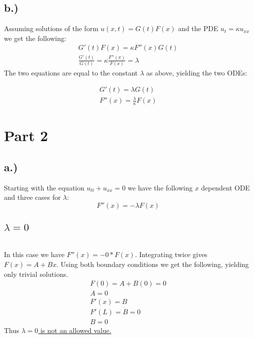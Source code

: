 \documentclass{article}
\begin{document}
\subsection*{b.)}
Assuming solutions of the form $u(x,t) = G(t)F(x)$ and the PDE $u_t = \kappa u_{xx}$ we get the following:
\begin{equation}
\begin{aligned}
G'(t)F(x) = \kappa F''(x)G(t)\\
\frac{G'(t)}{G(t)} = \kappa \frac{F''(x)}{F(x)} = \lambda
\end{aligned}
\end{equation}
The two equations are equal to the constant $\lambda $ as above, yielding the two ODEs:
\begin{tcolorbox}[minipage,colback=white,arc=0pt,outer arc=0pt]
\begin{equation}
\begin{aligned}
G'(t) = \lambda G(t)\\
F''(x) = \frac{\lambda}{\kappa} F(x)
\end{aligned}
\end{equation}
\end{tcolorbox}
\section*{Part 2}
\subsection*{a.)}
Starting with the equation $u_{tt} + u_{xx} = 0$ we have the following $x$ dependent ODE and three cases for $\lambda$:
\begin{equation}
F''(x) = -\lambda F(x)
\end{equation}
\subsection*{\underline{$\lambda = 0$}}~\newline 
\\
In this case we have $F''(x) = - 0 * F(x)$. Integrating twice gives $F(x) = A + Bx$. Using both boundary conditions we get the following, yielding only trivial solutions.
\begin{equation}
\begin{aligned}
F(0) = A + B(0) = 0\\
A = 0\\
F'(x) = B\\
F'(L) = B = 0\\
B = 0
\end{aligned}
\end{equation}
Thus \underline{$\lambda = 0$ is not an allowed value.}
\end{document}
